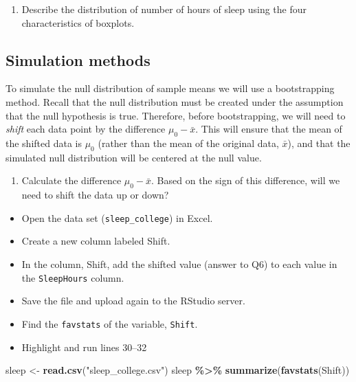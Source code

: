 \documentclass[
]{report}
\newenvironment{Shaded}{\begin{snugshade}}{\end{snugshade}}
\newcommand{\FunctionTok}[1]{\textcolor[rgb]{0.13,0.29,0.53}{\textbf{#1}}}
\newcommand{\NormalTok}[1]{#1}
\newcommand{\OtherTok}[1]{\textcolor[rgb]{0.56,0.35,0.01}{#1}}
\newcommand{\SpecialCharTok}[1]{\textcolor[rgb]{0.81,0.36,0.00}{\textbf{#1}}}
\newcommand{\StringTok}[1]{\textcolor[rgb]{0.31,0.60,0.02}{#1}}
\providecommand{\tightlist}{%
  \setlength{\itemsep}{0pt}\setlength{\parskip}{0pt}}
\begin{document}
\begin{enumerate}
\def\labelenumi{\arabic{enumi}.}
\setcounter{enumi}{4}
\tightlist
\item
  Describe the distribution of number of hours of sleep using the four characteristics of boxplots.
\end{enumerate}

\vspace{1in}

\subsection*{Simulation methods}\label{simulation-methods}

To simulate the null distribution of sample means we will use a bootstrapping method. Recall that the null distribution must be created under the assumption that the null hypothesis is true. Therefore, before bootstrapping, we will need to \emph{shift} each data point by the difference \(\mu_0 - \bar{x}\). This will ensure that the mean of the shifted data is \(\mu_0\) (rather than the mean of the original data, \(\bar{x}\)), and that the simulated null distribution will be centered at the null value.

\begin{enumerate}
\def\labelenumi{\arabic{enumi}.}
\setcounter{enumi}{5}
\tightlist
\item
  Calculate the difference \(\mu_0 - \bar{x}\). Based on the sign of this difference, will we need to shift the data up or down?
\end{enumerate}

\newpage

\begin{itemize}
\item
  Open the data set (\texttt{sleep\_college}) in Excel.
\item
  Create a new column labeled Shift.
\item
  In the column, Shift, add the shifted value (answer to Q6) to each value in the \texttt{SleepHours} column.
\item
  Save the file and upload again to the RStudio server.
\item
  Find the \texttt{favstats} of the variable, \texttt{Shift}.
\item
  Highlight and run lines 30--32
\end{itemize}

\begin{Shaded}
\begin{Highlighting}[]
\NormalTok{sleep }\OtherTok{\textless{}{-}} \FunctionTok{read.csv}\NormalTok{(}\StringTok{"sleep\_college.csv"}\NormalTok{)}
\NormalTok{sleep }\SpecialCharTok{\%\textgreater{}\%}
    \FunctionTok{summarize}\NormalTok{(}\FunctionTok{favstats}\NormalTok{(Shift))}
\end{Highlighting}
\end{Shaded}
\end{document}
